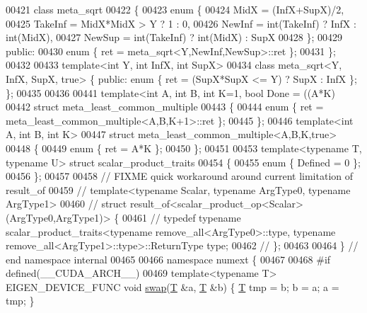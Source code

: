 \begin{DoxyCode}
00421 \textcolor{keyword}{class} meta\_sqrt
00422 \{
00423     \textcolor{keyword}{enum} \{
00424       MidX = (InfX+SupX)/2,
00425       TakeInf = MidX*MidX > Y ? 1 : 0,
00426       NewInf = \textcolor{keywordtype}{int}(TakeInf) ? InfX : int(MidX),
00427       NewSup = int(TakeInf) ? int(MidX) : SupX
00428     \};
00429   \textcolor{keyword}{public}:
00430     \textcolor{keyword}{enum} \{ ret = meta\_sqrt<Y,NewInf,NewSup>::ret \};
00431 \};
00432 
00433 \textcolor{keyword}{template}<\textcolor{keywordtype}{int} Y, \textcolor{keywordtype}{int} InfX, \textcolor{keywordtype}{int} SupX>
00434 \textcolor{keyword}{class }meta\_sqrt<Y, InfX, SupX, true> \{ \textcolor{keyword}{public}:  \textcolor{keyword}{enum} \{ ret = (SupX*SupX <= Y) ? SupX : InfX \}; \};
00435 
00436 
00441 \textcolor{keyword}{template}<\textcolor{keywordtype}{int} A, \textcolor{keywordtype}{int} B, \textcolor{keywordtype}{int} K=1, \textcolor{keywordtype}{bool} Done = ((A*K)%
00442 \textcolor{keyword}{struct }meta\_least\_common\_multiple
00443 \{
00444   \textcolor{keyword}{enum} \{ ret = meta\_least\_common\_multiple<A,B,K+1>::ret \};
00445 \};
00446 \textcolor{keyword}{template}<\textcolor{keywordtype}{int} A, \textcolor{keywordtype}{int} B, \textcolor{keywordtype}{int} K>
00447 \textcolor{keyword}{struct }meta\_least\_common\_multiple<A,B,K,true>
00448 \{
00449   \textcolor{keyword}{enum} \{ ret = A*K \};
00450 \};
00451 
00453 \textcolor{keyword}{template}<\textcolor{keyword}{typename} T, \textcolor{keyword}{typename} U> \textcolor{keyword}{struct }scalar\_product\_traits
00454 \{
00455   \textcolor{keyword}{enum} \{ Defined = 0 \};
00456 \};
00457 
00458 \textcolor{comment}{// FIXME quick workaround around current limitation of result\_of}
00459 \textcolor{comment}{// template<typename Scalar, typename ArgType0, typename ArgType1>}
00460 \textcolor{comment}{// struct result\_of<scalar\_product\_op<Scalar>(ArgType0,ArgType1)> \{}
00461 \textcolor{comment}{// typedef typename scalar\_product\_traits<typename remove\_all<ArgType0>::type, typename
       remove\_all<ArgType1>::type>::ReturnType type;}
00462 \textcolor{comment}{// \};}
00463 
00464 \} \textcolor{comment}{// end namespace internal}
00465 
00466 \textcolor{keyword}{namespace }numext \{
00467   
00468 \textcolor{preprocessor}{#if defined(\_\_CUDA\_ARCH\_\_)}
00469 \textcolor{keyword}{template}<\textcolor{keyword}{typename} T> EIGEN\_DEVICE\_FUNC   \textcolor{keywordtype}{void} \hyperlink{endian_8c_a3ca5ecd34b04d6a243c054ac3a57f68d}{swap}(\hyperlink{group___sparse_core___module_class_eigen_1_1_triplet}{T} &a, \hyperlink{group___sparse_core___module_class_eigen_1_1_triplet}{T} &b) \{ \hyperlink{group___sparse_core___module_class_eigen_1_1_triplet}{T} tmp = b; b = a; a = tmp; \}

\end{DoxyCode}
